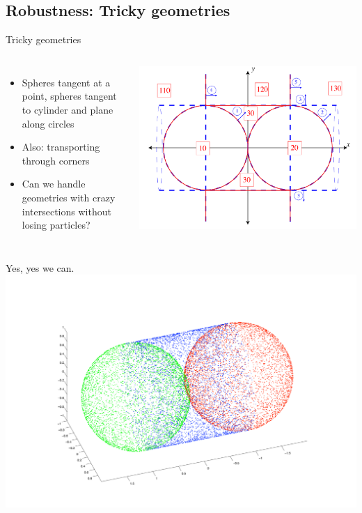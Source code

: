 \documentclass[color={usenames, dvipsnames},ignorenonframetext]{beamer}
\begin{document}
\subsection{Robustness: Tricky geometries}
\begin{frame}{Tricky geometries}
\begin{columns}[c]
\begin{itemize}
  \item Spheres tangent at a point, spheres tangent to cylinder and plane along
    circles
  \item Also: transporting through corners
  \item Can we handle geometries with crazy intersections without losing
    particles?
\end{itemize}

    \includegraphics[width=\textwidth, keepaspectratio]{tricky_geometry}
\end{columns}
\end{frame}
\begin{frame}{Yes, yes we can.}
    \includegraphics[width=\textwidth, keepaspectratio]{tricky_geometry_matlab}
\end{frame}
\end{document}
